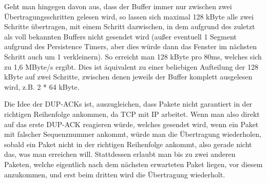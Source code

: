 \documentclass{../exercisesheet}
\begin{document}
\begin{exercise}{6}
\begin{subexercise}
\begin{description}
Geht man hingegen davon aus, dass der Buffer immer nur zwischen zwei Übertragungsschritten gelesen wird, so lassen sich maximal 128 kByte alle zwei Schritte übertragen, mit einem Schritt dazwischen, in dem aufgrund des zuletzt als voll bekannten Buffers nicht gesendet wird (außer eventuell 1 Segment aufgrund des Persistence Timers, aber dies würde dann das Fenster im nächsten Schritt auch um 1 verkleinern). So erreicht man 128 kByte pro 80ms, welches sich zu 1,6 MByte/s ergibt. Dies ist äquivalent zu einer beliebigen Aufteilung der 128 kByte auf zwei Schritte, zwischen denen jeweils der Buffer komplett ausgelesen wird, z.B. 2 * 64 kByte.
\end{description}
\end{subexercise}
\begin{subexercise}
Die Idee der DUP-ACKs ist, auszugleichen, dass Pakete nicht garantiert in der richtigen Reihenfolge ankommen, da TCP mit IP arbeitet. Wenn man also direkt auf das erste DUP-ACK reagieren würde, welches gesendet wird, wenn ein Paket mit falscher Sequenznummer ankommt, würde man die Übertragung wiederholen, sobald ein Paket nicht in der richtigen Reihenfolge ankommt, also gerade nicht das, was man erreichen will. Stattdessen erlaubt man bis zu zwei anderen Paketen, welche eigentlich nach dem nächsten erwarteten Paket liegen, vor diesem anzukommen, und erst beim dritten wird die Übertragung wiederholt. 
\end{subexercise}
\end{exercise}
\end{document}
